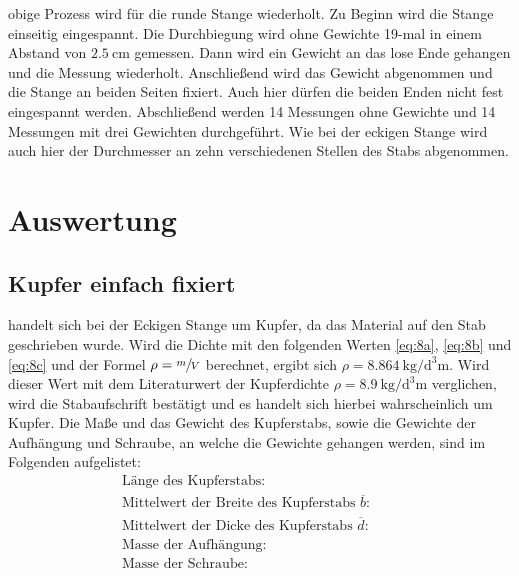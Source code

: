 \justifying obige Prozess wird für die runde Stange wiederholt. Zu Beginn wird die Stange einseitig eingespannt. Die Durchbiegung
wird ohne Gewichte 19-mal in einem Abstand von $\SI{2.5}{\centi\meter}$ gemessen. Dann wird ein Gewicht an das lose Ende 
gehangen und die Messung wiederholt. Anschließend wird das Gewicht abgenommen und die Stange an beiden Seiten fixiert. Auch hier dürfen die beiden Enden
nicht fest eingespannt werden. Abschließend werden 14 Messungen ohne Gewichte und 14 Messungen mit drei Gewichten durchgeführt. Wie bei der eckigen Stange
wird auch hier der Durchmesser an zehn verschiedenen Stellen des Stabs abgenommen.


\section{Auswertung}\justifying


\subsection{Kupfer einfach fixiert}\label{sec:4.1}

\justifying handelt sich bei der Eckigen Stange um Kupfer, da das Material auf den Stab geschrieben wurde. 
Wird die Dichte mit den folgenden Werten \eqref{eq:8a}, \eqref{eq:8b} und \eqref{eq:8c} und der Formel $\rho = \sfrac{m}{V}$
berechnet, ergibt sich $\rho = \SI{8.864}{\kilo\gram\per\cubic\deci\meter}$. Wird dieser Wert mit dem Literaturwert der Kupferdichte
$\rho = \SI{8.9}{\kilo\gram\per\cubic\deci\meter}$ \cite{Kupferdichte} verglichen, wird die Stabaufschrift bestätigt und es handelt sich 
hierbei wahrscheinlich um Kupfer.
Die Maße und das Gewicht des Kupferstabs, sowie die Gewichte der Aufhängung und Schraube, an welche die Gewichte gehangen 
werden, sind im Folgenden aufgelistet: 
\begin{subequations}\label{eq:8}
\begin{align}
    &\text{Länge des Kupferstabs:} \qquad &\text{} \label{eq:8a}\\
    &\text{Mittelwert der Breite des Kupferstabs $\overline{b}$:} \qquad &\text{} \label{eq:8b}\\
    &\text{Mittelwert der Dicke des Kupferstabs $\overline{d}$:} \qquad &\text{} \label{eq:8c}\\
    &\text{Masse der Aufhängung:} \qquad &\text{} \label{eq:8d}\\
    &\text{Masse der Schraube:} \qquad &\text{} \label{eq:8e}
\end{align}
\end{subequations}

